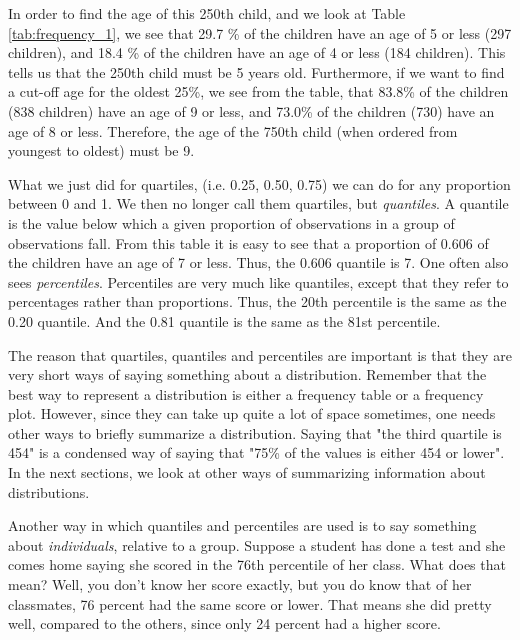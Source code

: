 In order to find the age of this 250th child, and we look at Table \ref{tab:frequency_1}, we see that 29.7 \% of the children have an age of 5 or less (297 children), and 18.4 \% of the children have an age of 4 or less (184 children). This tells us that the 250th child must be 5 years old. Furthermore, if we want to find a cut-off age for the oldest 25\%, we see from the table, that 83.8\% of the children (838 children) have an age of 9 or less, and 73.0\% of the children (730) have an age of 8 or less. Therefore, the age of the 750th child (when ordered from youngest to oldest) must be 9.


What we just did for quartiles, (i.e. 0.25, 0.50, 0.75) we can do for any proportion between 0 and 1. We then no longer call them quartiles, but \textit{quantiles}. A quantile is the value below which a given proportion of observations in a group of observations fall. From this table it is easy to see that a proportion of 0.606 of the children have an age of 7 or less. Thus, the 0.606 quantile is 7. One often also sees \textit{percentiles}. Percentiles are very much like quantiles, except that they refer to percentages rather than proportions. Thus, the 20th percentile is the same as the 0.20 quantile. And the 0.81 quantile is the same as the 81st percentile.

The reason that quartiles, quantiles and percentiles are important is that they are very short ways of saying something about a distribution. Remember that the best way to represent a distribution is either a frequency table or a frequency plot. However, since they can take up quite a lot of space sometimes, one needs other ways to briefly summarize a distribution. Saying that "the third quartile is 454" is a condensed way of saying that "75\% of the values is either 454 or lower". In the next sections, we look at other ways of summarizing information about distributions.

Another way in which quantiles and percentiles are used is to say something about \textit{individuals}, relative to a group. Suppose a student has done a test and she comes home saying she scored in the 76th percentile of her class. What does that mean? Well, you don't know her score exactly, but you do know that of her classmates, 76 percent had the same score or lower. That means she did pretty well, compared to the others, since only 24 percent had a higher score.

